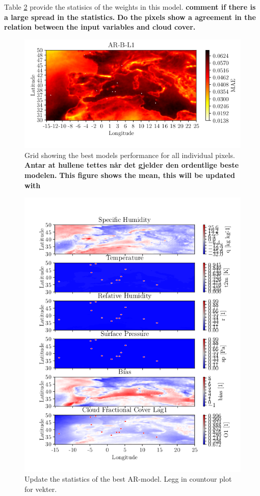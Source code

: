 Table \ref{tab:weights_best_model} provide the statisics of the weights in this model. \textbf{comment if there is a large spread in the statistics.} \textbf{Do the pixels show a agreement in the relation between the input variables and cloud cover.}
\begin{figure}
    \centering
    \includegraphics{python_figs/mea_best_ar_model_tcc.png}
    \caption{Grid showing the best models performance for all individual pixels. \textbf{Antar at hullene tettes når det gjelder den ordentlige beste modelen.} \textbf{This figure shows the mean, this will be updated with }}
    \label{fig:grid_mse_best_model}
\end{figure}

\begin{figure}
    \centering
    \includegraphics{python_figs/weights_best_ar_model.png}
    \caption{Update the statistics of the best AR-model. Legg in countour plot for vekter.}
    \label{tab:weights_best_model}
\end{figure}




